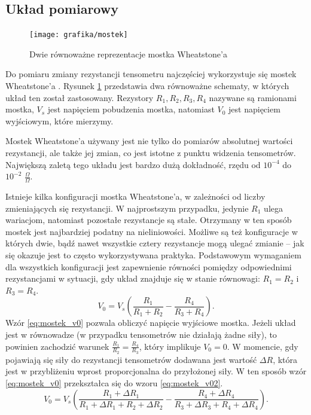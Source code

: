 \documentclass[printmode]{mgr}
\begin{document}
\subsection{Układ pomiarowy}
\begin{figure}[tp]
\centering
  \texttt{[image: grafika/mostek]}
  \caption{Dwie równoważne reprezentacje mostka Wheatstone'a}
  \label{rys:mostek}  
\end{figure}
Do pomiaru zmiany rezystancji tensometru najczęściej wykorzystuje się mostek Wheatstone'a \cite{tensometry}. Rysunek \ref{rys:mostek}
przedstawia dwa równoważne schematy, w których układ ten został zastosowany. Rezystory $R_1, R_2, R_3, R_4$ nazywane są ramionami mostka,
$V_s$ jest napięciem pobudzenia mostka, natomiast $V_0$ jest napięciem wyjściowym, które mierzymy.

Mostek Wheatstone'a używany jest nie tylko do pomiarów
absolutnej wartości rezystancji, ale także jej zmian, co jest istotne z punktu widzenia tensometrów. Największą zaletą
tego układu jest bardzo dużą dokładność, rzędu od $10^{-4}$ do $10^{-2}$ $\frac{\Omega}{\Omega}$.

Istnieje kilka konfiguracji mostka Wheatstone'a, w zależności od liczby zmieniających się rezystancji.
W najprostszym przypadku, jedynie $R_1$ ulega wariacjom, natomiast pozostałe rezystancje są stałe. Otrzymany w ten sposób
mostek jest najbardziej podatny na nieliniowości. Możliwe są też konfiguracje w których dwie, bądź nawet wszystkie cztery rezystancje
mogą ulegać zmianie -- jak się okazuje jest to często wykorzystywana praktyka. Podstawowym wymaganiem dla wszystkich konfiguracji
jest zapewnienie równości pomiędzy odpowiednimi rezystancjami w sytuacji, gdy układ znajduje się w stanie równowagi: $R_1 = R_2$ i
$R_3 = R_4$.
\begin{equation}
V_0 = V_s (\frac{R_1}{R_1+R_2} - \frac{R_4}{R_3+R_4}).
\label{eq:mostek_v0}
\end{equation}
Wzór \ref{eq:mostek_v0} pozwala obliczyć napięcie wyjściowe mostka. Jeżeli układ jest w równowadze (w przypadku tensometrów nie działają
żadne siły), to powinien zachodzić warunek $\frac{R_1}{R_2} = \frac{R_4}{R_3}$, który implikuje $V_0 = 0$.
W momencie, gdy pojawiają się siły do rezystancji tensometrów dodawana jest wartość $\Delta R$, która jest w przybliżeniu
wprost proporcjonalna do przyłożonej siły. W ten sposób wzór \ref{eq:mostek_v0} przekształca się do wzoru \ref{eq:mostek_v02}.
\begin{equation}
V_0 = V_s (\frac{R_1 + \Delta R_1}{R_1 + \Delta R_1 +R_2  + \Delta R_2} - \frac{R_4 + \Delta R_4}{R_3 + \Delta R_3 + R_4 + \Delta R_4}).
\label{eq:mostek_v02}
\end{equation}
\end{document}
